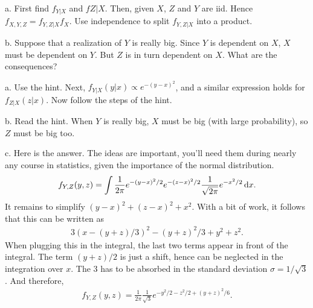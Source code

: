 \setcounter{theorem}{10}
\begin{exercise}[BH.7.11]
\begin{hint}
a.
First find $f_{Y|X}$ and $f{Z|X}$. Then, given $X$, $Z$ and $Y$ are iid. Hence $f_{X,Y,Z} = f_{Y, Z |X} f_{X}$. Use independence to split $f_{Y,Z|X}$ into a product.


b.
Suppose that  a realization of $Y$ is really big. Since $Y$ is dependent on $X$, $X$ must be dependent on $Y$. But $Z$ is in turn dependent on $X$. What are the consequences?

\end{hint}
\begin{solution}
a. Use the hint. Next, $f_{Y|X}(y|x) \propto e^{-(y-x)^{2}}$, and a similar expression holds for $f_{Z|X}(z|x)$. Now follow the steps of the hint.

b. Read the hint. When $Y$ is really big, $X$ must be big (with large probability), so $Z$ must be big too.

 c.
Here is the answer. The ideas are important, you'll need them during nearly any course in statistics, given the importance of the normal distribution.
\begin{align*}
f_{Y,Z}(y, z) = \int \frac 1 {2\pi} e^{-(y-x)^2/2} e^{-(z-x)^2/2} \frac 1 {\sqrt{2\pi}} e^{-x^2/2}\,\textrm{d}x.
\end{align*}
It remains to simplify $(y-x)^2 + (z-x)^2 + x^2$. With a bit of work, it follows that this can be written as
\begin{align*}
3(x-(y+z)/3)^{2} - (y+z)^2/3+y^2+z^2.
\end{align*}
When plugging this in the integral, the last two terms appear in front of the integral. The term $(y+z)/2$ is just a shift, hence can be neglected in the integration over $x$. The $3$ has to be absorbed in the standard deviation $\sigma=1/\sqrt{3}$. And therefore,
\begin{align*}
f_{Y,Z}(y, z) = \frac 1 {2\pi} \frac 1 {\sqrt{3}} e^{-y^2/2 - z^2/2 + (y+z)^2/6}.
\end{align*}
\end{solution}
\end{exercise}

